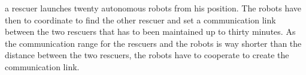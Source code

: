 a rescuer launches twenty autonomous robots from his position. The robots have then to coordinate to find the other rescuer and set a communication link between the two rescuers that has to been maintained up to thirty minutes. As the communication range for the rescuers and the robots is way shorter than the distance between the two rescuers, the robots have to cooperate to create the communication link. 


